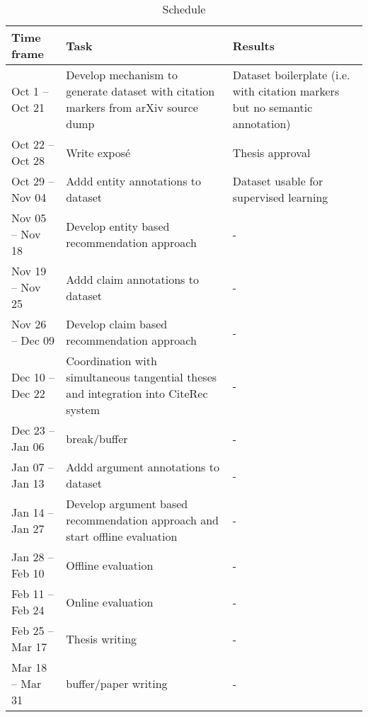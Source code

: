 \documentclass{proseminar}
\begin{document}
\begin{table*}
\centering
\caption{Schedule}\label{schedule}
\hphantom{ }
\begin{tabular}{|p{2.5cm}|p{6cm}|p{4cm}|} \hline
Time frame&Task&Results\\ \hline
Oct 1 -- Oct 21 & Develop mechanism to generate dataset with citation markers from arXiv source dump & Dataset boilerplate (i.e. with citation markers but no semantic annotation)\\ \hline
Oct 22 -- Oct 28 & Write expos\'e  & Thesis approval\\ \hline
Oct 29 -- Nov 04 & Addd entity annotations to dataset & Dataset usable for supervised learning\\ \hline
Nov 05 -- Nov 18 & Develop entity based recommendation approach & -\\ \hline
Nov 19 -- Nov 25 & Addd claim annotations to dataset & -\\ \hline
Nov 26 -- Dec 09 & Develop claim based recommendation approach & -\\ \hline
Dec 10 -- Dec 22 & Coordination with simultaneous tangential theses and integration into CiteRec system & -\\ \hline
Dec 23 -- Jan 06 & break/buffer & -\\ \hline
Jan 07 -- Jan 13 & Addd argument annotations to dataset & -\\ \hline
Jan 14 -- Jan 27 & Develop argument based recommendation approach and start offline evaluation & -\\ \hline
Jan 28 -- Feb 10 & Offline evaluation & -\\ \hline
Feb 11 -- Feb 24 & Online evaluation & -\\ \hline
Feb 25 -- Mar 17 & Thesis writing & -\\ \hline
Mar 18 -- Mar 31 & buffer/paper writing & -\\ \hline\end{tabular}
\end{table*}
\end{document}
